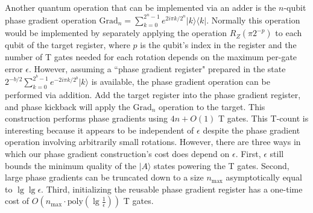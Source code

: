 \documentclass[twocolumn]{revtex4-1}
\begin{document}
Another quantum operation that can be implemented via an adder is the $n$-qubit phase gradient operation $\text{Grad}_n = \sum_{k=0}^{2^n-1} e^{2 i \pi k / 2^n} |k\rangle \langle k|$.
Normally this operation would be implemented by separately applying the operation $R_Z(\pi 2^{-p})$ to each qubit of the target register, where $p$ is the qubit's index in the register and the number of T gates needed for each rotation depends on the maximum per-gate error $\epsilon$.
However, assuming a ``phase gradient register" prepared in the state $2^{-b/2} \sum_{k=0}^{2^b-1} e^{-2 i \pi k / 2^b} |k\rangle$ is available, the phase gradient operation can be performed via addition.
Add the target register into the phase gradient register, and phase kickback will apply the $\text{Grad}_n$ operation to the target.
This construction performs phase gradients using $4n + O(1)$ T gates.
This T-count is interesting because it appears to be independent of $\epsilon$ despite the phase gradient operation involving arbitrarily small rotations.
However, there are three ways in which our phase gradient construction's cost does depend on $\epsilon$.
First, $\epsilon$ still bounds the minimum quality of the $|A\rangle$ states powering the T gates.
Second, large phase gradients can be truncated down to a size $n_{\text{max}}$ asymptotically equal to $\lg \lg \epsilon$.
Third, initializing the reusable phase gradient register has a one-time cost of $O(n_{\text{max}} \cdot \text{poly}(\lg \frac{1}{\epsilon}))$ T gates.
\end{document}
